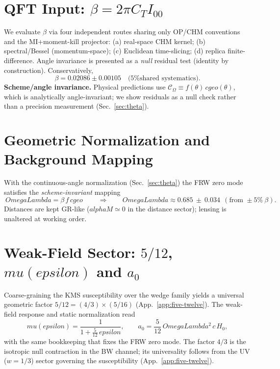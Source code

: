 \documentclass[aps,prd,onecolumn,superscriptaddress,nofootinbib]{revtex4-2}
\def\OmL{OmegaLambda}%
\def\cgeo{cgeo}%
\def\alphaM{alphaM}%
\def\eps{epsilon}%
\def\boxed#1{#1}%
\def\mu{mu}%
\def\alpha{alpha}%
\def\alpha_M{alphaM}%
\def\Omega_\Lambda{OmegaLambda}%
\providecommand{\OmL}{\Omega_\Lambda}
\providecommand{\cgeo}{c_{\rm geo}}
\providecommand{\alphaM}{\alpha_M}
\providecommand{\eps}{\varepsilon}
\begin{document}
\section{QFT Input: \texorpdfstring{$\beta=2\pi C_T I_{00}$}{beta}}
\label{sec:beta}
We evaluate $\beta$ via four independent routes sharing only OP/CHM conventions and the MI+moment-kill projector: (a) real-space CHM kernel; (b) spectral/Bessel (momentum-space); (c) Euclidean time-slicing; (d) replica finite-difference. Angle invariance is presented as a \emph{null} residual test (identity by construction). Conservatively,
\begin{equation}
\beta = 0.02086 \pm 0.00105 \quad \text{(5\% shared systematics)}.
\end{equation}
\noindent\textbf{Scheme/angle invariance.} Physical predictions use $\mathcal C_\Omega\equiv f(\theta)\, \cgeo(\theta)$, which is analytically angle-invariant; we show residuals as a null check rather than a precision measurement (Sec.~\ref{sec:theta}).

\section{Geometric Normalization and Background Mapping}
\label{sec:geom-map}
With the continuous-angle normalization (Sec.~\ref{sec:theta}) the FRW zero mode satisfies the \emph{scheme-invariant} mapping
\begin{equation}
\boxed{\ \OmL = \beta\, f\, \cgeo\ } \qquad \Rightarrow \qquad \OmL \approx 0.685 \ \pm\ 0.034\ \ (\text{from }\pm 5\%\ \beta).
\end{equation}
Distances are kept GR-like ($\alphaM\simeq 0$ in the distance sector); lensing is unaltered at working order.

\section{Weak-Field Sector: \texorpdfstring{$5/12$}{5/12}, \texorpdfstring{$\mu(\eps)$}{mu} and \texorpdfstring{$a_0$}{a0}}
\label{sec:weakfield}
Coarse-graining the KMS susceptibility over the wedge family yields a universal geometric factor $5/12=(4/3)\times(5/16)$ (App.~\ref{app:five-twelve}). The weak-field response and static normalization read
\begin{equation}
\label{eq:mu-a0}
\mu(\eps)=\frac{1}{1+\tfrac{5}{12}\,\eps},\qquad
a_0=\frac{5}{12}\,\OmL^2\,c\,H_0,
\end{equation}
with the same bookkeeping that fixes the FRW zero mode. The factor $4/3$ is the isotropic null contraction in the BW channel; its universality follows from the UV ($w=1/3$) sector governing the susceptibility (App.~\ref{app:five-twelve}).
\end{document}
